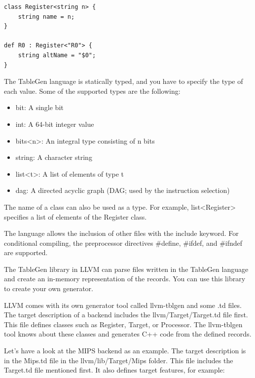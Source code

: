 \begin{lstlisting}[caption={}]
class Register<string n> {
	string name = n;
}

def R0 : Register<"R0"> {
	string altName = "$0";
}
\end{lstlisting}

The TableGen language is statically typed, and you have to specify the type of each value. Some of the supported types are the following:\par

\begin{itemize}
	\item bit: A single bit
	\item int: A 64-bit integer value
	\item bits<n>: An integral type consisting of n bits
	\item string: A character string
	\item list<t>: A list of elements of type t
	\item dag: A directed acyclic graph (DAG; used by the instruction selection)
\end{itemize}

The name of a class can also be used as a type. For example, list<Register> specifies a list of elements of the Register class.\par

The language allows the inclusion of other files with the include keyword. For  conditional compiling, the preprocessor directives \#define, \#ifdef, and \#ifndef are supported.\par

The TableGen library in LLVM can parse files written in the TableGen language and create an in-memory representation of the records. You can use this library to create your own generator.\par

LLVM comes with its own generator tool called llvm-tblgen and some .td files. The target description of a backend includes the llvm/Target/Target.td file first. This file defines classes such as Register, Target, or Processor. The llvm-tblgen tool knows about these classes and generates C++ code from the defined records.\par

Let's have a look at the MIPS backend as an example. The target description is in the Mips.td file in the llvm/lib/Target/Mips folder. This file includes the Target.td file mentioned first. It also defines target features, for example:\par

